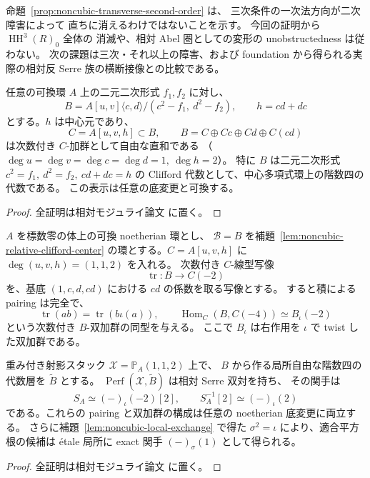 \begin{remark}[二次持上げと実際のモジュライとの距離]
命題~\ref{prop:noncubic-transverse-second-order} は、
三次条件の一次法方向が二次障害によって
直ちに消えるわけではないことを示す。
今回の証明から $\operatorname{HH}^3(R)_0$ 全体の
消滅や、相対 Abel 圏としての変形の unobstructedness
は従わない。
次の課題は三次・それ以上の障害、および
foundation から得られる実際の相対反 Serre
族の横断接像との比較である。
\end{remark}

\begin{lemma}
\label{lem:noncubic-relative-clifford-center}
任意の可換環 $A$ 上の二元二次形式 $f_1,f_2$ に対し、
\[
 B=A[u,v]\langle c,d\rangle/(c^2-f_1,\ d^2-f_2),
 \qquad h=cd+dc
\]
とする。$h$ は中心元であり、
\[
 C=A[u,v,h]\subset B,\qquad
 B=C\oplus Cc\oplus Cd\oplus C(cd)
 \tag{NC-Cl}\label{eq:noncubic-relative-clifford}
\]
は次数付き $C$-加群として自由な直和である
（$\deg u=\deg v=\deg c=\deg d=1,\ \deg h=2$）。
特に $B$ は二元二次形式
$c^2=f_1,\ d^2=f_2,\ cd+dc=h$
の Clifford 代数として、中心多項式環上の階数四の代数である。
この表示は任意の底変更と可換する。
\end{lemma}
\begin{proof}
全証明は相対モジュライ論文 \cite[\texttt{noncubic_stack}]{QuadricModuli2026} に置く。
\end{proof}

\begin{proposition}
\label{prop:noncubic-relative-serre-on-perfect}
$A$ を標数零の体上の可換 noetherian 環とし、
$\mathcal B=B$ を補題~\ref{lem:noncubic-relative-clifford-center}
の環とする。$C=A[u,v,h]$ に
$\deg(u,v,h)=(1,1,2)$ を入れる。
次数付き $C$-線型写像
\[
 \operatorname{tr}:B\longrightarrow C(-2)
\]
を、基底 $(1,c,d,cd)$ における $cd$ の係数を取る写像とする。
すると積による pairing は完全で、
\[
 \operatorname{tr}(ab)=\operatorname{tr}(b\iota(a)),
 \qquad
 \operatorname{Hom}_C(B,C(-4))
       \simeq B_{\iota}(-2)
 \tag{NC-Serre}\label{eq:noncubic-relative-serre-bimodule}
\]
という次数付き $B$-双加群の同型を与える。
ここで $B_\iota$ は右作用を $\iota$ で twist した双加群である。

重み付き射影スタック
$\mathcal X=\mathbb P_A(1,1,2)$ 上で、
$B$ から作る局所自由な階数四の代数層を $\widetilde B$ とする。
$\operatorname{Perf}(\mathcal X,\widetilde B)$ は相対 Serre 双対を持ち、
その関手は
\[
 S_A\simeq(-)_\iota(-2)[2],
 \qquad S_A^{-1}[2]\simeq(-)_\iota(2)
 \tag{NC-S}\label{eq:noncubic-relative-serre-functor}
\]
である。これらの pairing と双加群の構成は任意の
noetherian 底変更に両立する。
さらに補題~\ref{lem:noncubic-local-exchange} で得た
$\sigma^2=\iota$ により、適合平方根の候補は
\'etale 局所に exact 関手 $(-)_\sigma(1)$ として得られる。
\end{proposition}
\begin{proof}
全証明は相対モジュライ論文 \cite[\texttt{noncubic_stack}]{QuadricModuli2026} に置く。
\end{proof}

